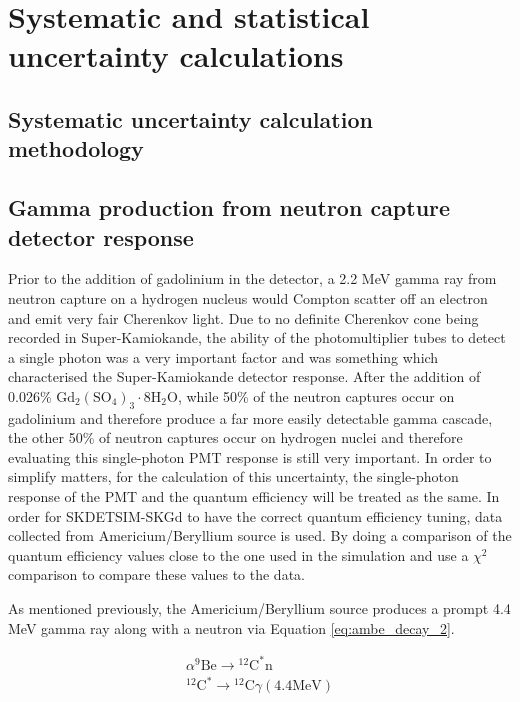\chapter{Systematic and statistical uncertainty calculations}
\label{chp:syst}



\section{Systematic uncertainty calculation methodology}



\section{Gamma production from neutron capture detector response}

Prior to the addition of gadolinium in the detector, a 2.2 MeV gamma ray from neutron capture on a hydrogen nucleus would Compton scatter off an electron and emit very fair Cherenkov light. Due to no definite Cherenkov cone being recorded in Super-Kamiokande, the ability of the photomultiplier tubes to detect a single photon was a very important factor and was something which characterised the Super-Kamiokande detector response. After the addition of 0.026\% $\mathrm{Gd}_{2}\left(\mathrm{SO}_{4}\right)_{3} \cdot 8 \mathrm{H}_{2} \mathrm{O}$, while 50\% of the neutron captures occur on gadolinium and therefore produce a far more easily detectable gamma cascade, the other 50\% of neutron captures occur on hydrogen nuclei and therefore evaluating this single-photon PMT response is still very important. In order to simplify matters, for the calculation of this uncertainty, the single-photon response of the PMT and the quantum efficiency will be treated as the same. In order for SKDETSIM-SKGd to have the correct quantum efficiency tuning, data collected from Americium/Beryllium source is used. By doing a comparison of the quantum efficiency values close to the one used in the simulation and use a $\chi^{2}$ comparison to compare these values to the data. 

As mentioned previously, the Americium/Beryllium source produces a prompt 4.4 MeV gamma ray along with a neutron via Equation \ref{eq:ambe_decay_2}.            


\begin{equation}
\begin{aligned}
\alpha{ }^9 \mathrm{Be} \longrightarrow{ }^{12} \mathrm{C}^* \mathrm{n} \\
{ }^{12} \mathrm{C}^* \longrightarrow{ }^{12} \mathrm{C} \gamma(4.4 \mathrm{MeV})
\end{aligned}
\label{eq:ambe_decay_2}
\end{equation}

